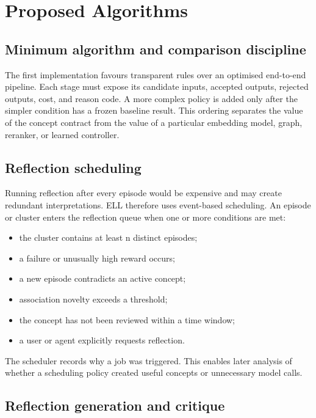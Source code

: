 \documentclass[
  english,
  a4paper,
  DIV=11,
  numbers=noendperiod]{scrreprt}
\begin{document}

\chapter{Proposed Algorithms}\label{proposed-algorithms}

\section{Minimum algorithm and comparison
discipline}\label{minimum-algorithm-and-comparison-discipline}

The first implementation favours transparent rules over an optimised
end-to-end pipeline. Each stage must expose its candidate inputs,
accepted outputs, rejected outputs, cost, and reason code. A more
complex policy is added only after the simpler condition has a frozen
baseline result. This ordering separates the value of the concept
contract from the value of a particular embedding model, graph,
reranker, or learned controller.

\section{Reflection scheduling}\label{reflection-scheduling}

Running reflection after every episode would be expensive and may create
redundant interpretations. ELL therefore uses event-based scheduling. An
episode or cluster enters the reflection queue when one or more
conditions are met:

\begin{itemize}
\item
  the cluster contains at least n distinct episodes;
\item
  a failure or unusually high reward occurs;
\item
  a new episode contradicts an active concept;
\item
  association novelty exceeds a threshold;
\item
  the concept has not been reviewed within a time window;
\item
  a user or agent explicitly requests reflection.
\end{itemize}

The scheduler records why a job was triggered. This enables later
analysis of whether a scheduling policy created useful concepts or
unnecessary model calls.

\section{Reflection generation and
critique}\label{reflection-generation-and-critique}
\end{document}

